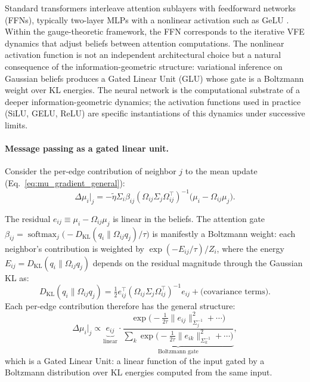 \documentclass[twoside,11pt]{article}
\begin{document}
Standard transformers interleave attention sublayers with feedforward networks (FFNs), typically two-layer MLPs with a nonlinear activation such as GeLU \citep{hendrycks2016gaussian}. Within the gauge-theoretic framework, the FFN corresponds to the iterative VFE dynamics that adjust beliefs between attention computations. The nonlinear activation function is not an independent architectural choice but a natural consequence of the information-geometric structure: variational inference on Gaussian beliefs produces a Gated Linear Unit (GLU) \citep{dauphin2017language} whose gate is a Boltzmann weight over KL energies. The neural network is the computational substrate of a deeper information-geometric dynamics; the activation functions used in practice (SiLU, GELU, ReLU) are specific instantiations of this dynamics under successive limits.

\paragraph{Message passing as a gated linear unit.}

Consider the per-edge contribution of neighbor $j$ to the mean update (Eq.~\ref{eq:mu_gradient_general}):
%
\begin{equation}
\Delta\mu_i\big|_j = -\tilde{\eta} \Sigma_i \beta_{ij} (\Omega_{ij}\Sigma_j\Omega_{ij}^\top)^{-1}\bigl(\mu_i - \Omega_{ij}\mu_j\bigr).
\label{eq:glu_message}
\end{equation}
%

The residual $e_{ij} \equiv \mu_i - \Omega_{ij}\mu_j$ is linear in the beliefs. The attention gate $\beta_{ij} = \operatorname{softmax}_j \bigl(-D_{\mathrm{KL}}(q_i \| \Omega_{ij}q_j)/\tau\bigr)$ is manifestly a Boltzmann weight: each neighbor's contribution is weighted by $\exp(-E_{ij}/\tau)/Z_i$, where the energy $E_{ij} = D_{\mathrm{KL}}(q_i \| \Omega_{ij}q_j)$ depends on the residual magnitude through the Gaussian KL as:
%
\begin{equation}
D_{\mathrm{KL}}(q_i \| \Omega_{ij}q_j) = \tfrac{1}{2} e_{ij}^\top (\Omega_{ij}\Sigma_j\Omega_{ij}^\top)^{-1} e_{ij} + \text{(covariance terms)}.
\label{eq:dkl_quadratic}
\end{equation}
%
Each per-edge contribution therefore has the general structure:
%
\begin{equation}
\boxed{\Delta\mu_i\big|_j \propto \underbrace{e_{ij}}_{\text{linear}} \cdot \underbrace{\frac{\exp \bigl(-\tfrac{1}{2\tau}\|e_{ij}\|^2_{\Sigma_j^{-1}} + \cdots\bigr)}{\sum_k \exp \bigl(-\tfrac{1}{2\tau}\|e_{ik}\|^2_{\Sigma_k^{-1}} + \cdots\bigr)}}_{\text{Boltzmann gate}},}
\label{eq:vfe_glu}
\end{equation}
%
which is a Gated Linear Unit: a linear function of the input gated by a Boltzmann distribution over KL energies computed from the same input.
\end{document}

